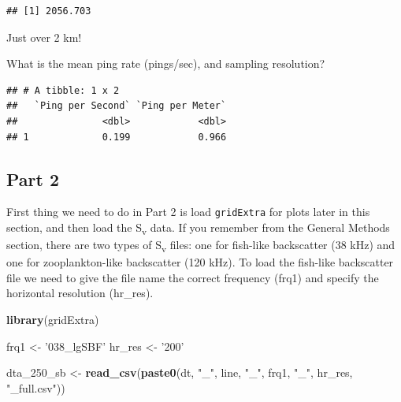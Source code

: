 \documentclass[]{article}
\newenvironment{Shaded}{\begin{snugshade}}{\end{snugshade}}
\newcommand{\DataTypeTok}[1]{\textcolor[rgb]{0.13,0.29,0.53}{#1}}
\newcommand{\DecValTok}[1]{\textcolor[rgb]{0.00,0.00,0.81}{#1}}
\newcommand{\KeywordTok}[1]{\textcolor[rgb]{0.13,0.29,0.53}{\textbf{#1}}}
\newcommand{\NormalTok}[1]{#1}
\newcommand{\OperatorTok}[1]{\textcolor[rgb]{0.81,0.36,0.00}{\textbf{#1}}}
\newcommand{\OtherTok}[1]{\textcolor[rgb]{0.56,0.35,0.01}{#1}}
\newcommand{\StringTok}[1]{\textcolor[rgb]{0.31,0.60,0.02}{#1}}
\begin{document}
\begin{verbatim}
## [1] 2056.703
\end{verbatim}

Just over 2 km!

What is the mean ping rate (pings/sec), and sampling resolution?

\begin{Shaded}
\end{Shaded}

\begin{verbatim}
## # A tibble: 1 x 2
##   `Ping per Second` `Ping per Meter`
##               <dbl>            <dbl>
## 1             0.199            0.966
\end{verbatim}

\hypertarget{part-2}{%
\subsection{Part 2}\label{part-2}}

 First thing we need to do in Part 2 is load \texttt{gridExtra} for
plots later in this section, and then load the S\textsubscript{v} data.
If you remember from the General Methods section, there are two types of
S\textsubscript{v} files: one for fish-like backscatter (38 kHz) and one
for zooplankton-like backscatter (120 kHz). To load the fish-like
backscatter file we need to give the file name the correct frequency
(frq1) and specify the horizontal resolution (hr\_res).

\begin{Shaded}
\begin{Highlighting}[]
\KeywordTok{library}\NormalTok{(gridExtra)}
\end{Highlighting}
\end{Shaded}

\begin{Shaded}
\begin{Highlighting}[]
\NormalTok{frq1 <-}\StringTok{ '038_lgSBF'}
\NormalTok{hr_res <-}\StringTok{ '200'}

\NormalTok{dta_}\DecValTok{250}\NormalTok{_sb <-}\StringTok{ }\KeywordTok{read_csv}\NormalTok{(}\KeywordTok{paste0}\NormalTok{(dt, }\StringTok{"_"}\NormalTok{, line, }\StringTok{"_"}\NormalTok{, frq1, }\StringTok{"_"}\NormalTok{, hr_res, }\StringTok{"_full.csv"}\NormalTok{))}
\end{Highlighting}
\end{Shaded}
\end{document}
